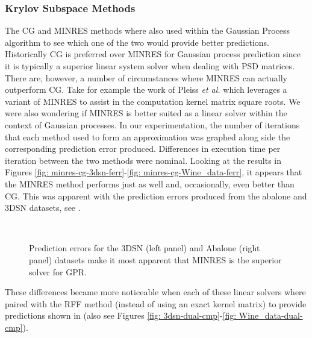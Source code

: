 \subsubsection{Krylov Subspace Methods}\label{Section5.3.2}

The CG and MINRES methods where also used within the Gaussian Process algorithm to see which one of the two would provide better predictions. Historically CG is preferred over MINRES for Gaussian process prediction since it is typically a superior linear system solver when dealing with PSD matrices. There are, however, a number of circumstances where MINRES can actually outperform CG. Take for example the work of Pleiss {\it et al.} \cite{arxiv200611267} which leverages a variant of MINRES to assist in the computation kernel matrix square roots. We were also wondering if MINRES is better suited as a linear solver within the context of Gaussian processes. In our experimentation, the number of iterations that each method used to form an approximation was graphed along side the corresponding prediction error produced. Differences in execution time per iteration between the two methods were nominal. Looking at the results in Figures \ref{fig: minres-cg-3dsn-ferr}-\ref{fig: minres-cg-Wine_data-ferr}, it appears that the MINRES method performs just as well and, occasionally, even better than CG. This was apparent with the prediction errors produced from the abalone and 3DSN datasets, see .
\begin{figure}[ht]
    \centering
    \\
    \caption{Prediction errors for the 3DSN (left panel) and Abalone (right panel) datasets make it most apparent that MINRES is the superior solver for GPR.}
    \label{fig: minres-vs-cg-exact}
\end{figure}
These differences became more noticeable when each of these linear solvers where paired with the RFF method (instead of using an exact kernel matrix) to provide predictions shown in  (also see Figures \ref{fig: 3dsn-dual-cmp}-\ref{fig: Wine_data-dual-cmp}).
